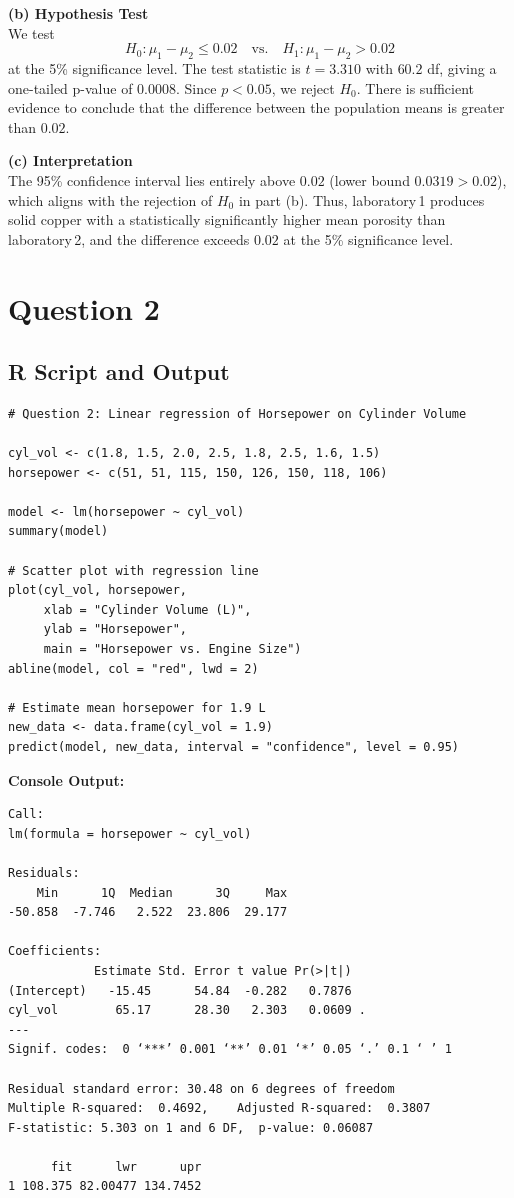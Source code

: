 \documentclass[11pt, a4paper]{article}
\begin{document}
\textbf{(b) Hypothesis Test}\\
We test 
\[
H_0: \mu_1-\mu_2 \le 0.02 \quad \text{vs.} \quad H_1: \mu_1-\mu_2 > 0.02
\]
at the 5\% significance level. The test statistic is $t = 3.310$ with $60.2$ df, giving a one-tailed p-value of $0.0008$. Since $p < 0.05$, we reject $H_0$. There is sufficient evidence to conclude that the difference between the population means is greater than $0.02$.

\textbf{(c) Interpretation}\\
The 95\% confidence interval lies entirely above $0.02$ (lower bound $0.0319 > 0.02$), which aligns with the rejection of $H_0$ in part (b). Thus, laboratory 1 produces solid copper with a statistically significantly higher mean porosity than laboratory 2, and the difference exceeds $0.02$ at the 5\% significance level.

\section*{Question 2}

\subsection*{R Script and Output}
\begin{lstlisting}
# Question 2: Linear regression of Horsepower on Cylinder Volume

cyl_vol <- c(1.8, 1.5, 2.0, 2.5, 1.8, 2.5, 1.6, 1.5)
horsepower <- c(51, 51, 115, 150, 126, 150, 118, 106)

model <- lm(horsepower ~ cyl_vol)
summary(model)

# Scatter plot with regression line
plot(cyl_vol, horsepower, 
     xlab = "Cylinder Volume (L)", 
     ylab = "Horsepower",
     main = "Horsepower vs. Engine Size")
abline(model, col = "red", lwd = 2)

# Estimate mean horsepower for 1.9 L
new_data <- data.frame(cyl_vol = 1.9)
predict(model, new_data, interval = "confidence", level = 0.95)
\end{lstlisting}

\textbf{Console Output:}
\begin{lstlisting}
Call:
lm(formula = horsepower ~ cyl_vol)

Residuals:
    Min      1Q  Median      3Q     Max 
-50.858  -7.746   2.522  23.806  29.177 

Coefficients:
            Estimate Std. Error t value Pr(>|t|)  
(Intercept)   -15.45      54.84  -0.282   0.7876  
cyl_vol        65.17      28.30   2.303   0.0609 .
---
Signif. codes:  0 ‘***’ 0.001 ‘**’ 0.01 ‘*’ 0.05 ‘.’ 0.1 ‘ ’ 1

Residual standard error: 30.48 on 6 degrees of freedom
Multiple R-squared:  0.4692,	Adjusted R-squared:  0.3807 
F-statistic: 5.303 on 1 and 6 DF,  p-value: 0.06087

      fit      lwr      upr
1 108.375 82.00477 134.7452
\end{lstlisting}
\end{document}
